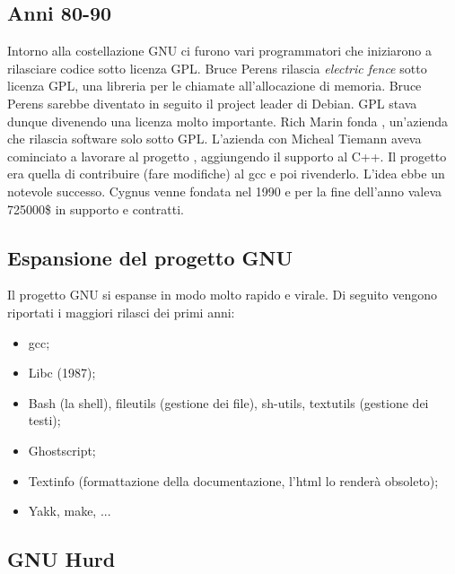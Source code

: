 \subsection{Anni 80-90}

Intorno alla costellazione GNU ci furono vari programmatori che iniziarono a rilasciare codice sotto licenza GPL. Bruce Perens rilascia \textit{electric fence} sotto licenza GPL, una libreria per le chiamate all'allocazione di memoria. Bruce Perens sarebbe diventato in seguito il project leader di Debian.
\linebreak
\linebreak
GPL stava dunque divenendo una licenza molto importante. Rich Marin fonda , un'azienda che rilascia software solo sotto GPL. L'azienda  con Micheal Tiemann aveva cominciato a lavorare al progetto , aggiungendo il supporto al C++. Il progetto era quella di contribuire (fare modifiche) al gcc e poi rivenderlo. L'idea ebbe un notevole successo. Cygnus venne fondata nel 1990 e per la fine dell'anno valeva 725000\$ in supporto e contratti.

\subsection{Espansione del progetto GNU}

Il progetto GNU si espanse in modo molto rapido e virale. Di seguito vengono riportati i maggiori rilasci dei primi anni:

\begin{itemize}

\item gcc;
\item Libc (1987);
\item Bash (la shell), fileutils (gestione dei file), sh-utils, textutils (gestione dei testi);
\item Ghostscript;
\item Textinfo (formattazione della documentazione, l'html lo renderà obsoleto);
\item Yakk, make, ...

\end{itemize}

\subsection{GNU Hurd}

